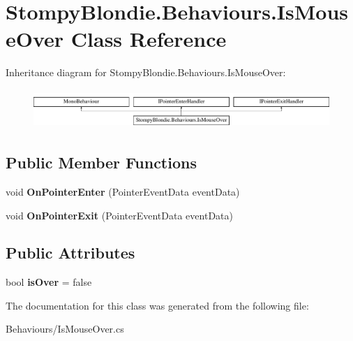 \hypertarget{class_stompy_blondie_1_1_behaviours_1_1_is_mouse_over}{}\section{Stompy\+Blondie.\+Behaviours.\+Is\+Mouse\+Over Class Reference}
\label{class_stompy_blondie_1_1_behaviours_1_1_is_mouse_over}
Inheritance diagram for Stompy\+Blondie.\+Behaviours.\+Is\+Mouse\+Over\+:\begin{figure}[H]
\begin{center}
\leavevmode
\includegraphics[height=1.487384cm]{class_stompy_blondie_1_1_behaviours_1_1_is_mouse_over}
\end{center}
\end{figure}
\subsection*{Public Member Functions}
\begin{DoxyCompactItemize}
\item 
\mbox{\label{class_stompy_blondie_1_1_behaviours_1_1_is_mouse_over_ad8eda7c464bd30cf1104447052e04e32}} 
void {\bfseries On\+Pointer\+Enter} (Pointer\+Event\+Data event\+Data)
\item 
\mbox{\label{class_stompy_blondie_1_1_behaviours_1_1_is_mouse_over_ad624ad1de28269173b245a8456d34ef8}} 
void {\bfseries On\+Pointer\+Exit} (Pointer\+Event\+Data event\+Data)
\end{DoxyCompactItemize}
\subsection*{Public Attributes}
\begin{DoxyCompactItemize}
\item 
\mbox{\label{class_stompy_blondie_1_1_behaviours_1_1_is_mouse_over_a4b31cf2a692c0cdf41c04d399a70c332}} 
bool {\bfseries is\+Over} = false
\end{DoxyCompactItemize}


The documentation for this class was generated from the following file\+:\begin{DoxyCompactItemize}
\item 
Behaviours/Is\+Mouse\+Over.\+cs\end{DoxyCompactItemize}
